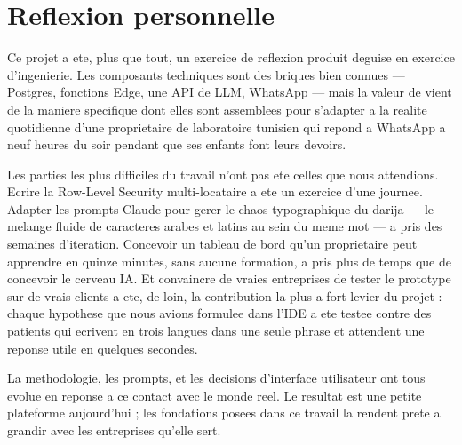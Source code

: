 \section*{Reflexion personnelle}
Ce projet a ete, plus que tout, un exercice de reflexion produit
deguise en exercice d'ingenierie. Les composants techniques sont des
briques bien connues --- Postgres, fonctions Edge, une API de LLM,
WhatsApp --- mais la valeur de \nova{} vient de la maniere specifique
dont elles sont assemblees pour s'adapter a la realite quotidienne
d'une proprietaire de laboratoire tunisien qui repond a WhatsApp a
neuf heures du soir pendant que ses enfants font leurs devoirs.

Les parties les plus difficiles du travail n'ont pas ete celles que
nous attendions. Ecrire la Row-Level Security multi-locataire a ete
un exercice d'une journee. Adapter les prompts Claude pour gerer le
chaos typographique du darija --- le melange fluide de caracteres
arabes et latins au sein du meme mot --- a pris des semaines
d'iteration. Concevoir un tableau de bord qu'un proprietaire peut
apprendre en quinze minutes, sans aucune formation, a pris plus de
temps que de concevoir le cerveau IA. Et convaincre de vraies
entreprises de tester le prototype sur de vrais clients a ete, de
loin, la contribution la plus a fort levier du projet : chaque
hypothese que nous avions formulee dans l'IDE a ete testee contre des
patients qui ecrivent en trois langues dans une seule phrase et
attendent une reponse utile en quelques secondes.

La methodologie, les prompts, et les decisions d'interface utilisateur
ont tous evolue en reponse a ce contact avec le monde reel. Le resultat
est une petite plateforme aujourd'hui ; les fondations posees dans ce
travail la rendent prete a grandir avec les entreprises qu'elle sert.
